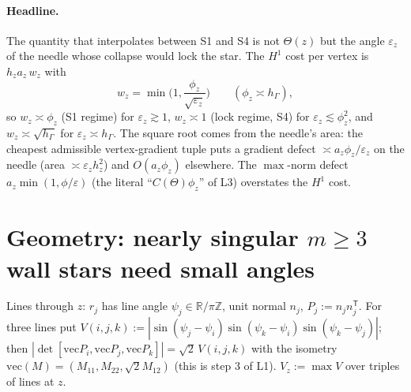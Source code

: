 \documentclass[11pt]{article}
\theoremstyle{remark}
\newcommand{\hG}{h_\Gamma}
\begin{document}
\paragraph{Headline.} The quantity that interpolates between S1 and S4 is not $\Theta(z)$ but the angle $\varepsilon_z$ of the
needle whose collapse would lock the star. The $H^1$ cost per vertex is $h_za_z\,w_z$ with
\[
w_z=\min\Big(1,\frac{\phi_z}{\sqrt{\varepsilon_z}}\Big)\qquad(\phi_z\asymp\hG),
\]
so $w_z\asymp\phi_z$ (S1 regime) for $\varepsilon_z\gtrsim1$, $w_z\asymp1$ (lock regime, S4) for $\varepsilon_z\lesssim\phi_z^2$,
and $w_z\asymp\sqrt{\hG}$ for $\varepsilon_z\asymp\hG$. The square root comes from the needle's area: the cheapest
admissible vertex-gradient tuple puts a gradient defect $\asymp a_z\phi_z/\varepsilon_z$ on the needle (area $\asymp\varepsilon_zh_z^2$)
and $O(a_z\phi_z)$ elsewhere. The $\max$-norm defect $a_z\min(1,\phi/\varepsilon)$ (the literal ``$C(\Theta)\phi_z$'' of L3)
overstates the $H^1$ cost.

\section{Geometry: nearly singular $m\ge3$ wall stars need small angles}
Lines through $z$: $r_j$ has line angle $\psi_j\in\mathbb R/\pi\mathbb Z$, unit normal $n_j$, $P_j:=n_jn_j^{\mathsf T}$.
For three lines put $V(i,j,k):=|\sin(\psi_j-\psi_i)\sin(\psi_k-\psi_i)\sin(\psi_k-\psi_j)|$; then
$|\det[\mathrm{vec}P_i,\mathrm{vec}P_j,\mathrm{vec}P_k]|=\sqrt2\,V(i,j,k)$ with the isometry $\mathrm{vec}(M)=(M_{11},M_{22},\sqrt2M_{12})$
(this is step 3 of L1). $V_z:=\max V$ over triples of lines at $z$.
\end{document}
